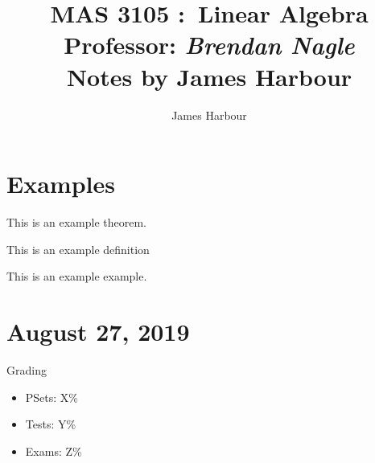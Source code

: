 \documentclass{scrartcl}
\author{James Harbour}
\title{
    \vspace{2in}
    \textmd{\textbf{MAS 3105 :\ Linear Algebra}}\\
    \vspace{0.1in}\large{Professor: \textit{Brendan Nagle}}\\
    \vspace{3in}
    Notes by James Harbour
}
\begin{document}
\maketitle
\newpage

\section{Examples}

\begin{theorem}
  This is an example theorem.
\end{theorem}

\begin{definition}
  This is an example definition
\end{definition}

\begin{example}
  This is an example example.
\end{example}

\section{August 27, 2019}

Grading
\begin{itemize}
  \item PSets: X\%
  \item Tests: Y\%
  \item Exams: Z\%
\end{itemize}
\end{document}
